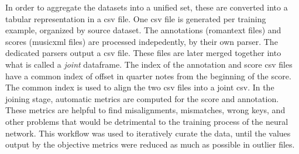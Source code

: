 
In order to aggregate the datasets into a unified set, these
are converted into a tabular representation in a \gls{csv}
file. One \gls{csv} file is generated per training example,
organized by source dataset. The annotations
(\gls{romantext} files) and scores (\gls{musicxml} files)
are processed indepedently, by their own parser. The
dedicated parsers output a \gls{csv} file. These files are
later merged together into what is called a \emph{joint}
dataframe. The index of the annotation and score \gls{csv}
files have a common index of offset in quarter notes from
the beginning of the score. The common index is used to
align the two \gls{csv} files into a joint \gls{csv}. In the
joining stage, automatic metrics are computed for the score
and annotation. These metrics are helpful to find
misalignments, mismatches, wrong keys, and other problems
that would be detrimental to the training process of the
neural network. This workflow was used to iteratively curate
the data, until the values output by the objective metrics
were reduced as much as possible in outlier files.
